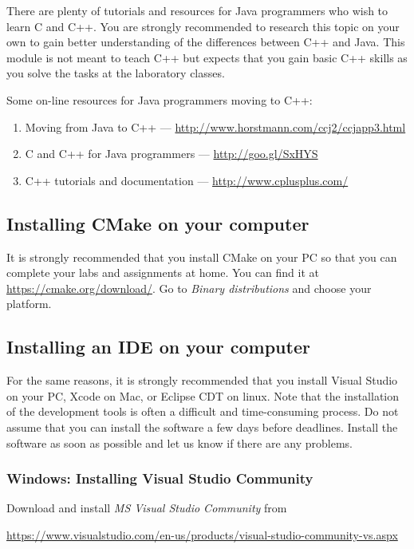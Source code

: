 There are plenty of tutorials and resources for Java programmers who wish
to learn C and C++. You are strongly recommended to research this
topic on your own to gain better understanding of the differences
between C++ and Java. This module is not meant to teach C++ but
expects that you gain basic C++ skills as you solve the tasks at the
laboratory classes.

Some on-line resources for Java programmers moving to C++:
\begin{enumerate}
 \item Moving from Java to C++ --- \url{http://www.horstmann.com/ccj2/ccjapp3.html}
 \item C and C++ for Java programmers --- \url{http://goo.gl/SxHYS}
 \item C++ tutorials and documentation --- \url{http://www.cplusplus.com/}
\end{enumerate}

\subsection{Installing CMake on your computer}

It is strongly recommended that you install CMake on your PC so that you can complete your labs and assignments at home. 
You can find it at \url{https://cmake.org/download/}. Go to \emph{Binary distributions} and choose your platform. 


\subsection{Installing an IDE on your computer}

For the same reasons, it is strongly recommended that you install Visual Studio on
your PC, Xcode on Mac, or Eclipse CDT on linux. 
Note that
the installation of the development tools is often a difficult and
time-consuming process. Do not assume that you can install the
software a few days before deadlines. Install the software as soon
as possible and let us know if there are any problems.

\subsubsection{Windows: Installing Visual Studio Community}

Download and install \emph{MS Visual Studio Community} from
    
    \url{https://www.visualstudio.com/en-us/products/visual-studio-community-vs.aspx}


